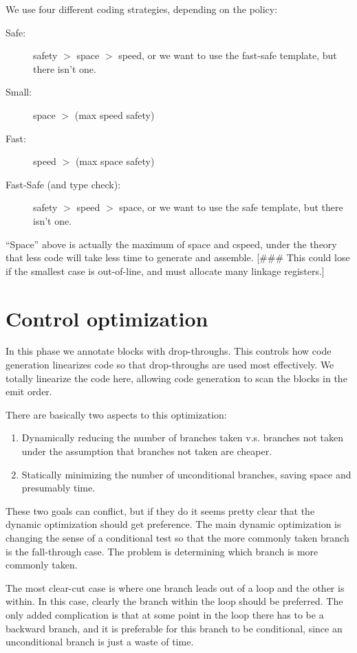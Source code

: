 We use four different coding strategies, depending on the policy:
\begin{description}
\item[Safe:]  safety $>$ space $>$ speed, or
we want to use the fast-safe template, but there isn't one.

\item[Small:] space $>$ (max speed safety)

\item[Fast:] speed $>$ (max space safety)

\item[Fast-Safe (and type check):] safety $>$ speed $>$ space, or we want to use
the safe template, but there isn't one.
\end{description}

``Space'' above is actually the maximum of space and cspeed, under the theory
that less code will take less time to generate and assemble.  [\#\#\# This could
lose if the smallest case is out-of-line, and must allocate many linkage
registers.]


\chapter{Control optimization}

In this phase we annotate blocks with drop-throughs.  This controls how code
generation linearizes code so that drop-throughs are used most effectively.  We
totally linearize the code here, allowing code generation to scan the blocks
in the emit order.

There are basically two aspects to this optimization:

\begin{enumerate}
\item
Dynamically reducing the number of branches taken v.s. branches not
taken under the assumption that branches not taken are cheaper.
\item
Statically minimizing the number of unconditional branches, saving
space and presumably time.
\end{enumerate}

These two goals can conflict, but if they do it seems pretty clear that the
dynamic optimization should get preference.  The main dynamic optimization is
changing the sense of a conditional test so that the more commonly taken branch
is the fall-through case.  The problem is determining which branch is more
commonly taken.

The most clear-cut case is where one branch leads out of a loop and the other
is within.  In this case, clearly the branch within the loop should be
preferred.  The only added complication is that at some point in the loop there
has to be a backward branch, and it is preferable for this branch to be
conditional, since an unconditional branch is just a waste of time.

